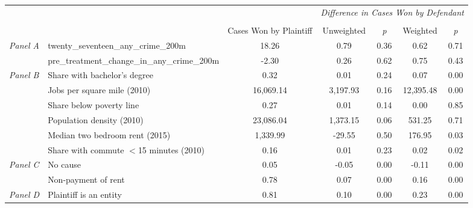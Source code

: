 \begin{tabular}{llccccc}
\toprule
 &  & \textit{} & \multicolumn{4}{c}{\textit{Difference in Cases Won by Defendant}} \\
\cline{4-7}
\\
 &  & Cases Won by Plaintiff & Unweighted & \emph{p} & Weighted & \emph{p} \\
\midrule
\multirow[c]{2}{3cm}{\textit{Panel A}} & twenty_seventeen_any_crime_200m & 18.26 & 0.79 & 0.36 & 0.62 & 0.71 \\
 & pre_treatment_change_in_any_crime_200m & -2.30 & 0.26 & 0.62 & 0.75 & 0.43 \\
\cline{1-7}
\multirow[c]{6}{3cm}{\textit{Panel B}} & Share with bachelor's degree & 0.32 & 0.01 & 0.24 & 0.07 & 0.00 \\
 & Jobs per square mile (2010) & 16,069.14 & 3,197.93 & 0.16 & 12,395.48 & 0.00 \\
 & Share below poverty line & 0.27 & 0.01 & 0.14 & 0.00 & 0.85 \\
 & Population density (2010) & 23,086.04 & 1,373.15 & 0.06 & 531.25 & 0.71 \\
 & Median two bedroom rent (2015) & 1,339.99 & -29.55 & 0.50 & 176.95 & 0.03 \\
 & Share with commute $<$15 minutes (2010) & 0.16 & 0.01 & 0.23 & 0.02 & 0.02 \\
\cline{1-7}
\multirow[c]{2}{3cm}{\textit{Panel C}} & No cause & 0.05 & -0.05 & 0.00 & -0.11 & 0.00 \\
 & Non-payment of rent & 0.78 & 0.07 & 0.00 & 0.16 & 0.00 \\
\cline{1-7}
\textit{Panel D} & Plaintiff is an entity & 0.81 & 0.10 & 0.00 & 0.23 & 0.00 \\
\cline{1-7}
\bottomrule
\end{tabular}
